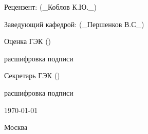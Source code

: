 \begin{titlepage}
\begin{center}
Рецензент:\hspace{3.05cm} \underline{\hspace{6cm}} \hspace{\fill}(\_Коблов К.Ю.\_)\\ 
\vspace{1em}
 
Заведующий кафедрой:\hspace{0.2cm} \underline{\hspace{6cm}} \hspace{\fill}(\_Першенков В.С\_)\\ 
\vspace{1em}
 
Оценка ГЭК\hspace{2.65cm} \underline{\hspace{6cm}} \hspace{\fill}(\underline{\hspace{4cm}})\\
\begin{footnotesize}
\hspace{\fill}\underline{\hspace{0.3cm}}расшифровка подписи\underline{\hspace{0.3cm}}\\
\end{footnotesize}
Секретарь ГЭК\hspace{2.05cm} \underline{\hspace{6cm}} \hspace{\fill}(\underline{\hspace{4cm}})\\ 

\begin{footnotesize}
\hspace{\fill}\underline{\hspace{0.3cm}}расшифровка подписи\underline{\hspace{0.3cm}}\\
\end{footnotesize}

\end{center}
 
\vspace{\fill}

\begin{center}
\today
\end{center}


\begin{center}
Москва
\end{center}

\end{titlepage}
